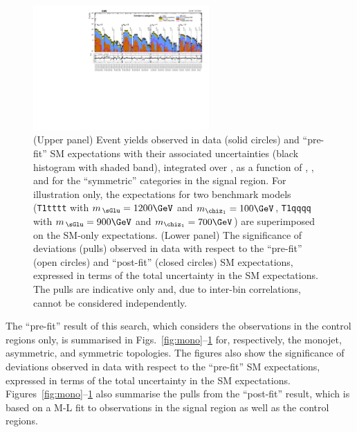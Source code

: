 \begin{figure}[!h]
  \begin{center}
    \includegraphics[angle=90,width=0.6\textwidth]{figures/result/v2/summaryPlot_Symmetric_prefit_overlay_fit_b}
    \caption{(Upper panel) Event yields observed in data (solid
      circles) and ``pre-fit'' SM expectations with their associated
      uncertainties (black histogram with shaded band), integrated
      over \HTmiss, as a function of \njet, \nb, and \scalht for the
      ``symmetric'' \njet categories in the signal region. For
      illustration only, the expectations for two benchmark models
      (\texttt{T1tttt} with $m_{\,\sGlu} = 1200\GeV$ and $m_{\chiz_1}
      = 100\GeV$, \texttt{T1qqqq} with $m_{\,\sGlu} = 900\GeV$ and
      $m_{\chiz_1} = 700\GeV$) are superimposed on the SM-only
      expectations. (Lower panel) The significance of deviations
      (pulls) observed in data with respect to the ``pre-fit'' (open
      circles) and ``post-fit'' (closed circles) SM expectations,
      expressed in terms of the total uncertainty in the SM
      expectations. The pulls are indicative only and, due to
      inter-bin correlations, cannot be considered independently.}
    \label{fig:sym}
  \end{center}
\end{figure}

The ``pre-fit'' result of this search, which considers the
observations in the control regions only, is summarised in
Figs.~\ref{fig:mono}--\ref{fig:sym} for, respectively, the monojet,
asymmetric, and symmetric topologies.
The figures also show the significance of deviations observed in data
with respect to the ``pre-fit'' SM expectations, expressed in terms of
the total uncertainty in the SM
expectations. Figures~\ref{fig:mono}--\ref{fig:sym} also summarise the
pulls from the ``post-fit'' result, which is based on a M-L fit to
observations in the signal region as well as the control regions.

